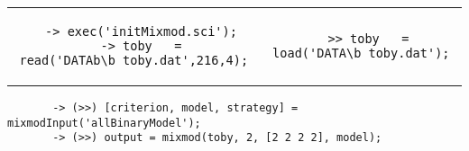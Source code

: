 \begin{tabular}{c|c}
\begin{minipage}[c]{0.47\columnwidth}%
{\scriptsize
\begin{verbatim}
  -> exec('initMixmod.sci');
  -> toby   = read('DATAb\b_toby.dat',216,4);
\end{verbatim}}
\end{minipage}%
&
\begin{minipage}[c]{0.53\columnwidth}%
{\scriptsize
\begin{verbatim}
  >> toby   = load('DATA\b_toby.dat');
\end{verbatim}}
\end{minipage}%
\end{tabular}

{\scriptsize
\begin{verbatim}
       -> (>>) [criterion, model, strategy] = mixmodInput('allBinaryModel');
       -> (>>) output = mixmod(toby, 2, [2 2 2 2], model);
\end{verbatim}}
